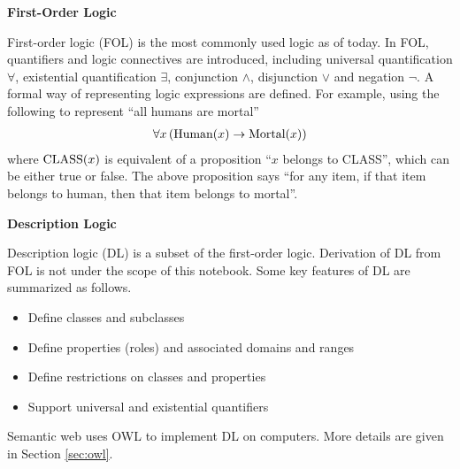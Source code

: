 \vspace{0.1in}
\noindent \textbf{First-Order Logic}
\vspace{0.1in}

First-order logic (FOL) is the most commonly used logic as of today. In FOL, quantifiers and logic connectives are introduced, including universal quantification $\forall$, existential quantification $\exists$, conjunction $\land$, disjunction $\lor$ and negation $\neg$. A formal way of representing logic expressions are defined. For example, using the following to represent ``all humans are mortal''
\begin{eqnarray}
	\forall x \left(\textup{Human}(x) \rightarrow \textup{Mortal}(x)\right) \nonumber
\end{eqnarray}
where $\textup{CLASS}(x)$ is equivalent of a proposition ``$x$ belongs to CLASS'', which can be either true or false. The above proposition says ``for any item, if that item belongs to human, then that item belongs to mortal''.

\vspace{0.1in}
\noindent \textbf{Description Logic}
\vspace{0.1in}

Description logic (DL) is a subset of the first-order logic. Derivation of DL from FOL is not under the scope of this notebook. Some key features of DL are summarized as follows.
\begin{itemize}
	\item Define classes and subclasses
	\item Define properties (roles) and associated domains and ranges
	\item Define restrictions on classes and properties
	\item Support universal and existential quantifiers
\end{itemize}
Semantic web uses OWL to implement DL on computers. More details are given in Section \ref{sec:owl}.


